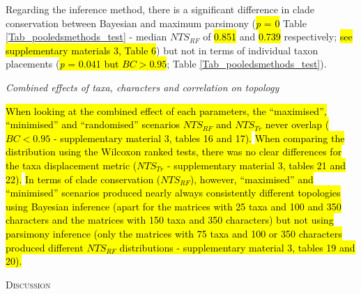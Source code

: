 \documentclass[12pt,letterpaper]{article}
\renewcommand{\section}[1]{%
\bigskip
\begin{center}
\begin{Large}
\normalfont\scshape #1
\medskip
\end{Large}
\end{center}}
\renewcommand{\subsection}[1]{%
\bigskip
\begin{center}
\begin{large}
\normalfont\itshape #1
\end{large}
\end{center}}
\begin{document}
Regarding the inference method, there is a significant difference in clade conservation between Bayesian and maximum parsimony (\hl{\textit{p} = 0} Table \ref{Tab_pooledsmethods_test} - median $NTS_{RF}$ of \hl{0.851} and \hl{0.739} respectively; \hl{see supplementary materials 3, Table 6}) but not in terms of individual taxon placements (\hl{\textit{p} = 0.041 but $BC > 0.95$}; Table \ref{Tab_pooledsmethods_test}).




\subsection{Combined effects of taxa, characters and correlation on topology}

\hl{When looking at the combined effect of each parameters, the ``maximised'', ``minimised'' and ``randomised'' scenarios $NTS_{RF}$ and $NTS_{Tr}$ never overlap ($BC < 0.95$ - supplementary material 3, tables 16 and 17).}
\hl{When comparing the distribution using the Wilcoxon ranked tests, there was no clear differences for the taxa displacement metric ($NTS_{Tr}$ - supplementary material 3, tables 21 and 22).}
\hl{In terms of clade conservation ($NTS_{RF}$), however, ``maximised'' and ``minimised'' scenarios produced nearly always consistently different topologies using Bayesian inference (apart for the matrices with 25 taxa and 100 and 350 characters and the matrices with 150 taxa and 350 characters) but not using parsimony inference (only the matrices with 75 taxa and 100 or 350 characters produced different $NTS_{RF}$ distributions - supplementary material 3, tables 19 and 20).}

\section{Discussion}
\end{document}
